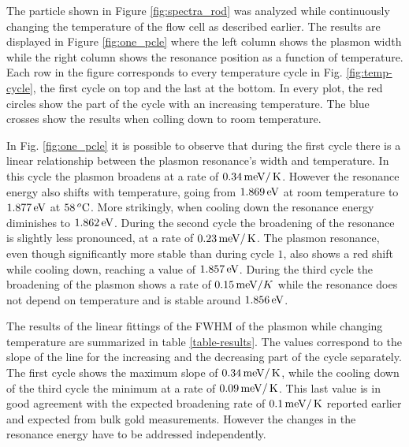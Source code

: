 The particle shown in Figure \ref{fig:spectra_rod} was analyzed while
continuously changing the temperature of the flow cell as described earlier. The
results are displayed in Figure \ref{fig:one_pcle} where the left column shows
the plasmon width while the right column shows the resonance position as a
function of temperature. Each row in the figure corresponds to every temperature
cycle in Fig. \ref{fig:temp-cycle}, the first cycle on top and the last at the
bottom. In every plot, the red circles show the part of the cycle with
an increasing temperature. The blue crosses show the results when
colling down to room temperature. 

In Fig. \ref{fig:one_pcle} it is possible to observe that during the first cycle
there is a linear relationship between the plasmon resonance's width and
temperature. In this cycle the plasmon broadens at a rate of $0.34\,\textrm{meV}/\,\textrm{K}$.
However the resonance energy also shifts with temperature, going from $1.869\,\textrm{eV}$
at room temperature to $1.877\,\textrm{eV}$ at $58\,^o\textrm{C}$. More strikingly, when cooling
down the resonance energy diminishes to $1.862\,\textrm{eV}$. During the second cycle the
broadening of the resonance is slightly less pronounced, at a rate of
$0.23\,\textrm{meV}/\,\textrm{K}$. The plasmon resonance, even though significantly more stable
than during cycle $1$, also shows a red shift while cooling down, reaching a value of
$1.857\,\textrm{eV}$. During the third cycle the broadening of the plasmon shows a rate of
$0.15\,\textrm{meV}/K$ while the resonance does not depend on temperature and is stable
around $1.856\,\textrm{eV}$.

The results of the linear fittings of the FWHM of the plasmon while changing
temperature are summarized in table \ref{table-results}. The values correspond
to the slope of the line for the increasing and the decreasing part of the cycle
separately. The first cycle shows the maximum slope of $0.34\,\textrm{meV}/\,\textrm{K}$, while the
cooling down of the third cycle the minimum at a rate of $0.09\,\textrm{meV}/\,\textrm{K}$. This
last value is in good agreement with the expected broadening rate of
$0.1\,\textrm{meV}/\,\textrm{K}$ reported earlier\cite{Liu2009b,Konrad2013} and expected from bulk gold
measurements. However the changes in the resonance energy have to be addressed
independently.

